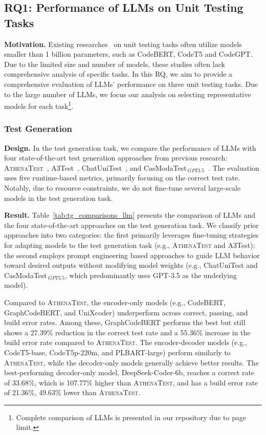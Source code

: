 
\subsection{RQ1: Performance of LLMs on Unit Testing Tasks}
\label{sec:rq1}

\textbf{Motivation.}
Existing researches~\cite{hu_identify_2023, tufano_unit_2021, yaraghi_automated_2024} on unit testing tasks often utilize models smaller than 1 billion parameters, such as CodeBERT, CodeT5 and CodeGPT. Due to the limited size and number of models, these studies often lack comprehensive analysis of specific tasks. 
In this RQ, we aim to provide a comprehensive evaluation of LLMs' performance on three unit testing tasks. Due to the large number of LLMs, we focus our analysis on selecting representative models for each task\footnote{Complete comparison of LLMs is presented in our repository due to page limit.}. 

\subsubsection{Test Generation}
\label{sec:rq1-test_generation}

\textbf{Design.}
In the test generation task, we compare the performance of LLMs with four state-of-the-art test generation approaches from previous research: \textsc{AthenaTest}~\cite{tufano_unit_2021}, A3Test~\cite{alagarsamy_a3test_2023}, ChatUniTest~\cite{chen_chatunitest_2024}, and CasModaTest$_{~GPT3.5}$~\cite{ni_casmodatest_2024}. 
The evaluation uses five runtime-based metrics, primarily focusing on the correct test rate. Notably, due to resource constraints, we do not fine-tune several large-scale models in the test generation task.



\textbf{Result.}
Table~\ref{tab:tg_comparisons_llm} presents the comparison of LLMs and the four state-of-the-art approaches on the test generation task. We classify prior approaches into two categories: the first primarily leverages fine-tuning strategies for adapting models to the test generation task (e.g., \textsc{AthenaTest} and A3Test); the second employs prompt engineering based approaches to guide LLM behavior toward desired outputs without modifying model weights (e.g., ChatUniTest and CasModaTest$_{~GPT3.5}$, which predominantly uses GPT-3.5 as the underlying model).

Compared to \textsc{AthenaTest}, the encoder-only models (e.g., CodeBERT, GraphCodeBERT, and UniXcoder) underperform across correct, passing, and build error rates. Among these, GraphCodeBERT performs the best but still shows a 27.39\% reduction in the correct test rate and a 55.36\% increase in the build error rate compared to \textsc{AthenaTest}. The encoder-decoder models (e.g., CodeT5-base, CodeT5p-220m, and PLBART-large) perform similarly to \textsc{AthenaTest}, while the decoder-only models generally achieve better results. The best-performing decoder-only model, DeepSeek-Coder-6b, reaches a correct rate of 33.68\%, which is 107.77\% higher than \textsc{AthenaTest}, and has a build error rate of 21.36\%, 49.63\% lower than \textsc{AthenaTest}.


